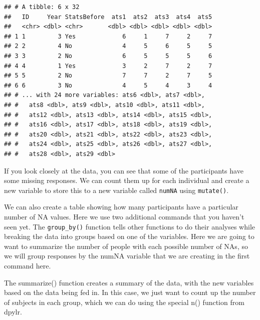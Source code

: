 \documentclass[12pt,]{book}
\newenvironment{Shaded}{\begin{snugshade}}{\end{snugshade}}
\newcommand{\CommentTok}[1]{\textcolor[rgb]{0.56,0.35,0.01}{\textit{#1}}}
\newcommand{\DataTypeTok}[1]{\textcolor[rgb]{0.13,0.29,0.53}{#1}}
\newcommand{\KeywordTok}[1]{\textcolor[rgb]{0.13,0.29,0.53}{\textbf{#1}}}
\newcommand{\NormalTok}[1]{#1}
\newcommand{\OperatorTok}[1]{\textcolor[rgb]{0.81,0.36,0.00}{\textbf{#1}}}
\newcommand{\StringTok}[1]{\textcolor[rgb]{0.31,0.60,0.02}{#1}}
\begin{document}
\begin{Shaded}
\end{Shaded}

\begin{verbatim}
## # A tibble: 6 x 32
##   ID     Year StatsBefore  ats1  ats2  ats3  ats4  ats5
##   <chr> <dbl> <chr>       <dbl> <dbl> <dbl> <dbl> <dbl>
## 1 1         3 Yes             6     1     7     2     7
## 2 2         4 No              4     5     6     5     5
## 3 3         2 No              6     5     5     5     6
## 4 4         1 Yes             3     2     7     2     7
## 5 5         2 No              7     7     2     7     5
## 6 6         3 No              4     5     4     3     4
## # ... with 24 more variables: ats6 <dbl>, ats7 <dbl>,
## #   ats8 <dbl>, ats9 <dbl>, ats10 <dbl>, ats11 <dbl>,
## #   ats12 <dbl>, ats13 <dbl>, ats14 <dbl>, ats15 <dbl>,
## #   ats16 <dbl>, ats17 <dbl>, ats18 <dbl>, ats19 <dbl>,
## #   ats20 <dbl>, ats21 <dbl>, ats22 <dbl>, ats23 <dbl>,
## #   ats24 <dbl>, ats25 <dbl>, ats26 <dbl>, ats27 <dbl>,
## #   ats28 <dbl>, ats29 <dbl>
\end{verbatim}

If you look closely at the data, you can see that some of the participants have some missing responses. We can count them up for each individual and create a new variable to store this to a new variable called \texttt{numNA} using \texttt{mutate()}.

We can also create a table showing how many participants have a particular number of NA values. Here we use two additional commands that you haven't seen yet. The \texttt{group\_by()} function tells other functions to do their analyses while breaking the data into groups based on one of the variables. Here we are going to want to summarize the number of people with each possible number of NAs, so we will group responses by the numNA variable that we are creating in the first command here.

The summarize() function creates a summary of the data, with the new variables based on the data being fed in. In this case, we just want to count up the number of subjects in each group, which we can do using the special n() function from dpylr.
\end{document}
